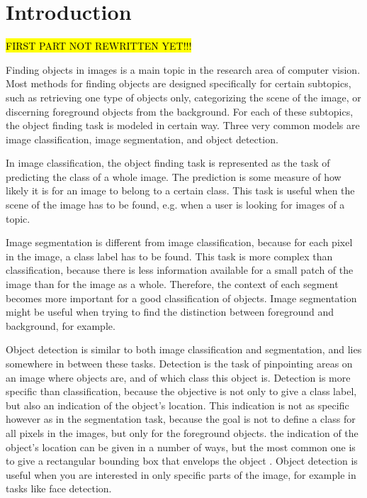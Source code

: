 \section{Introduction} %
\label{cha:introduction}
\hl{FIRST PART NOT REWRITTEN YET!!!}


Finding objects in images is a main topic in the research area of computer vision. Most methods for finding objects are designed specifically for certain subtopics, such as retrieving one type of objects only, categorizing the scene of the image, or discerning foreground objects from the background. For each of these subtopics, the object finding task is modeled in certain way. Three very common models are image classification, image segmentation, and object detection. 

In image classification, the object finding task is represented as the task of predicting the class of a whole image. The prediction is some measure of how likely it is for an image to belong to a certain class. This task is useful when the scene of the image has to be found, e.g. when a user is looking for images of a topic.

Image segmentation is different from image classification, because for each pixel in the image, a class label has to be found. This task is more complex than classification, because there is less information available for a small patch of the image than for the image as a whole. Therefore, the context of each segment becomes more important for a good classification of objects. Image segmentation might be useful when trying to find the distinction between foreground and background, for example.

Object detection is similar to both image classification and segmentation, and lies somewhere in between these tasks. Detection is the task of pinpointing areas on an image where objects are, and of which class this object is. Detection is more specific than classification, because the objective is not only to give a class label, but also an indication of the object's location. This indication is not as specific however as in the segmentation task, because the goal is not to define a class for all pixels in the images, but only for the foreground objects. the indication of the object's location can be given in a number of ways, but the most common one is to give a rectangular bounding box that envelops the object \cite{pascal-voc-2007}. Object detection is useful when you are interested in only specific parts of the image, for example in tasks like face detection. 

